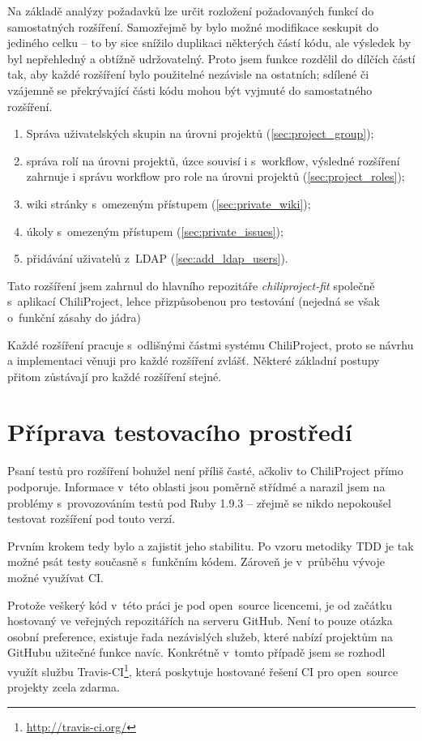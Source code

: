 \documentclass[thesis=B,czech]{FITthesis}[2012/05/02]
\begin{document}
Na základě analýzy požadavků lze určit rozložení požadovaných
funkcí do samostatných rozšíření. Samozřejmě by bylo možné modifikace
seskupit do jediného celku -- to by sice snížilo duplikaci některých částí kódu,
ale výsledek by byl nepřehledný a obtížně udržovatelný. Proto jsem funkce
rozdělil do dílčích částí tak, aby každé rozšíření bylo použitelné
nezávisle na ostatních; sdílené či vzájemně se překrývající části kódu
mohou být vyjmuté do samostatného rozšíření.

\begin{enumerate}
\item Správa uživatelských skupin na úrovni projektů (\ref{sec:project_group});
\item správa rolí na úrovni projektů, úzce souvisí i s~\gls{workflow}, výsledné rozšíření zahrnuje i
správu workflow pro role na úrovni projektů (\ref{sec:project_roles});
\item wiki stránky s~omezeným přístupem (\ref{sec:private_wiki});
\item úkoly s~omezeným přístupem (\ref{sec:private_issues});
\item přidávání uživatelů z~\gls{LDAP} (\ref{sec:add_ldap_users}).
\end{enumerate}

Tato rozšíření jsem zahrnul do hlavního repozitáře
\emph{chiliproject-fit} společně s~aplikací ChiliProject, lehce
přizpůsobenou pro testování (nejedná se však o~funkční zásahy do jádra)

Každé rozšíření pracuje s~odlišnými částmi systému ChiliProject, proto
se návrhu a implementaci věnuji pro každé rozšíření zvlášť. Některé
základní postupy přitom zůstávají pro každé rozšíření stejné.

\section{Příprava testovacího prostředí}

Psaní testů pro rozšíření bohužel není příliš časté, ačkoliv to
ChiliProject přímo podporuje. Informace v~této oblasti jsou poměrně
střídmé a narazil jsem na problémy s~provozováním testů pod Ruby 1.9.3
-- zřejmě se nikdo nepokoušel testovat rozšíření pod touto verzí.

Prvním krokem tedy bylo  a zajistit
jeho stabilitu. Po vzoru metodiky \gls{TDD} je tak možné psát testy
současně s~funkčním kódem. Zároveň je v~průběhu vývoje možné využívat
\gls{CI}.

Protože veškerý kód v~této práci je pod open~source licencemi,
je od začátku hostovaný ve veřejných repozitářích na serveru GitHub.
Není to pouze otázka osobní preference, existuje řada nezávislých služeb,
které nabízí projektům na GitHubu užitečné funkce navíc. Konkrétně
v~tomto případě jsem se rozhodl využít službu Travis-CI\footnote{\url{http://travis-ci.org/}},
která poskytuje hostované řešení \gls{CI} pro open~source projekty zcela zdarma.
\end{document}
